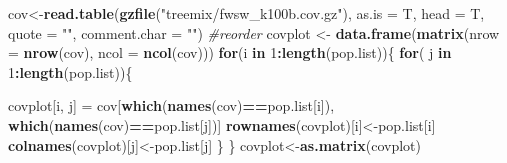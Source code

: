 \documentclass[]{article}
\newenvironment{Shaded}{\begin{snugshade}}{\end{snugshade}}
\newcommand{\KeywordTok}[1]{\textcolor[rgb]{0.13,0.29,0.53}{\textbf{#1}}}
\newcommand{\DataTypeTok}[1]{\textcolor[rgb]{0.13,0.29,0.53}{#1}}
\newcommand{\DecValTok}[1]{\textcolor[rgb]{0.00,0.00,0.81}{#1}}
\newcommand{\StringTok}[1]{\textcolor[rgb]{0.31,0.60,0.02}{#1}}
\newcommand{\CommentTok}[1]{\textcolor[rgb]{0.56,0.35,0.01}{\textit{#1}}}
\newcommand{\ControlFlowTok}[1]{\textcolor[rgb]{0.13,0.29,0.53}{\textbf{#1}}}
\newcommand{\OperatorTok}[1]{\textcolor[rgb]{0.81,0.36,0.00}{\textbf{#1}}}
\newcommand{\NormalTok}[1]{#1}
\begin{document}
\begin{Shaded}
\begin{Highlighting}[]
\NormalTok{cov<-}\KeywordTok{read.table}\NormalTok{(}\KeywordTok{gzfile}\NormalTok{(}\StringTok{"treemix/fwsw_k100b.cov.gz"}\NormalTok{), }\DataTypeTok{as.is =}\NormalTok{ T, }\DataTypeTok{head =}\NormalTok{ T, }\DataTypeTok{quote =} \StringTok{""}\NormalTok{, }\DataTypeTok{comment.char =} \StringTok{""}\NormalTok{)}
\CommentTok{#reorder}
\NormalTok{covplot <-}\StringTok{ }\KeywordTok{data.frame}\NormalTok{(}\KeywordTok{matrix}\NormalTok{(}\DataTypeTok{nrow =} \KeywordTok{nrow}\NormalTok{(cov), }\DataTypeTok{ncol =} \KeywordTok{ncol}\NormalTok{(cov)))}
\ControlFlowTok{for}\NormalTok{(i }\ControlFlowTok{in} \DecValTok{1}\OperatorTok{:}\KeywordTok{length}\NormalTok{(pop.list))\{}
  \ControlFlowTok{for}\NormalTok{( j }\ControlFlowTok{in} \DecValTok{1}\OperatorTok{:}\KeywordTok{length}\NormalTok{(pop.list))\{}
    
\NormalTok{    covplot[i, j] =}\StringTok{ }\NormalTok{cov[}\KeywordTok{which}\NormalTok{(}\KeywordTok{names}\NormalTok{(cov)}\OperatorTok{==}\NormalTok{pop.list[i]), }\KeywordTok{which}\NormalTok{(}\KeywordTok{names}\NormalTok{(cov)}\OperatorTok{==}\NormalTok{pop.list[j])]}
    \KeywordTok{rownames}\NormalTok{(covplot)[i]<-pop.list[i]}
    \KeywordTok{colnames}\NormalTok{(covplot)[j]<-pop.list[j]}
\NormalTok{  \}}
\NormalTok{\}}
\NormalTok{covplot<-}\KeywordTok{as.matrix}\NormalTok{(covplot)}
\end{Highlighting}
\end{Shaded}
\end{document}
